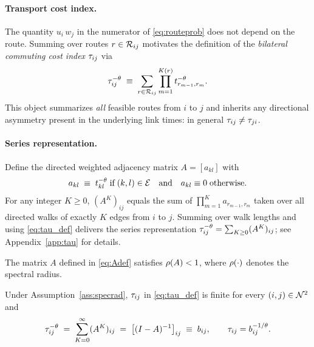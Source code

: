 \paragraph{Transport cost index.}
The quantity $u_i\,w_j$ in the numerator of \eqref{eq:routeprob} does
not depend on the route.  Summing over routes $r\in\mathcal R_{ij}$
motivates the definition of the \emph{bilateral commuting cost
index} $\tau_{ij}$ via
\begin{equation}
  \tau_{ij}^{-\theta}
  \;\equiv\;
  \sum_{r\in\mathcal R_{ij}}
  \prod_{m=1}^{K(r)} t_{r_{m-1},r_{m}}^{-\theta}.
  \label{eq:tau_def}
\end{equation}
This object summarizes \emph{all} feasible routes from $i$ to $j$ and
inherits any directional asymmetry present in the underlying link
times: in general $\tau_{ij}\neq\tau_{ji}$.

\paragraph{Series representation.}
Define the directed weighted adjacency matrix $A=[a_{kl}]$ with
\begin{equation}
  a_{kl}\;\equiv\;t_{kl}^{-\theta}\;\text{if}\;(k,l)\in\mathcal E
  \quad\text{and}\quad a_{kl}\equiv 0\;\text{otherwise}.
  \label{eq:Adef}
\end{equation}
For any integer $K\ge 0$, $(A^{K})_{ij}$ equals the sum of
$\prod_{m=1}^{K} a_{r_{m-1},r_{m}}$ taken over all directed walks of
exactly $K$ edges from $i$ to $j$.  Summing over walk lengths and
using \eqref{eq:tau_def} delivers the series representation
$\tau_{ij}^{-\theta}=\sum_{K\ge 0}(A^{K})_{ij}$; see
Appendix~\ref{app:tau} for details.

\begin{assumption}\label{ass:specrad}
The matrix $A$ defined in \eqref{eq:Adef} satisfies $\rho(A)<1$,
where $\rho(\cdot)$ denotes the spectral radius.
\end{assumption}

\begin{proposition}\label{prop:tau_series}
Under Assumption~\ref{ass:specrad}, $\tau_{ij}$ in \eqref{eq:tau_def} is
finite for every $(i,j)\in\mathcal N^2$ and
\begin{equation}
  \tau_{ij}^{-\theta}
  \;=\;
  \sum_{K=0}^{\infty}(A^{K})_{ij}
  \;=\;\bigl[(I-A)^{-1}\bigr]_{ij}
  \;\equiv\; b_{ij},
  \qquad
  \tau_{ij}=b_{ij}^{-1/\theta}.
  \label{eq:tau_series}
\end{equation}
\end{proposition}

